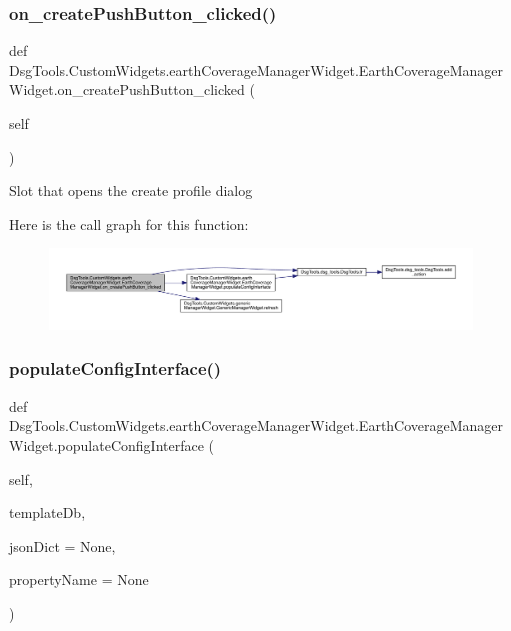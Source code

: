 \subsubsection{\texorpdfstring{on\+\_\+create\+Push\+Button\+\_\+clicked()}{on\_createPushButton\_clicked()}}
{\footnotesize\ttfamily def Dsg\+Tools.\+Custom\+Widgets.\+earth\+Coverage\+Manager\+Widget.\+Earth\+Coverage\+Manager\+Widget.\+on\+\_\+create\+Push\+Button\+\_\+clicked (\begin{DoxyParamCaption}\item[{}]{self }\end{DoxyParamCaption})}

\begin{DoxyVerb}Slot that opens the create profile dialog
\end{DoxyVerb}
 Here is the call graph for this function\+:
\nopagebreak
\begin{figure}[H]
\begin{center}
\leavevmode
\includegraphics[width=350pt]{class_dsg_tools_1_1_custom_widgets_1_1earth_coverage_manager_widget_1_1_earth_coverage_manager_widget_a12ec4dd59b87fa7c3838aceeda62742d_cgraph}
\end{center}
\end{figure}
\mbox{\label{class_dsg_tools_1_1_custom_widgets_1_1earth_coverage_manager_widget_1_1_earth_coverage_manager_widget_a64ae0f66203378930f749b2993c4474b}} 
\subsubsection{\texorpdfstring{populate\+Config\+Interface()}{populateConfigInterface()}}
{\footnotesize\ttfamily def Dsg\+Tools.\+Custom\+Widgets.\+earth\+Coverage\+Manager\+Widget.\+Earth\+Coverage\+Manager\+Widget.\+populate\+Config\+Interface (\begin{DoxyParamCaption}\item[{}]{self,  }\item[{}]{template\+Db,  }\item[{}]{json\+Dict = {\ttfamily None},  }\item[{}]{property\+Name = {\ttfamily None} }\end{DoxyParamCaption})}

